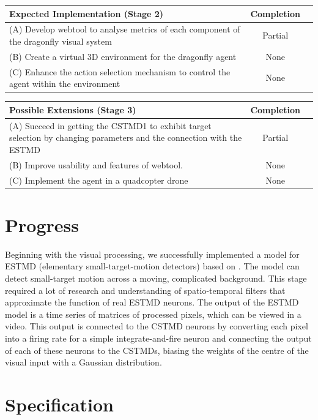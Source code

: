 \documentclass[a4paper,11pt]{article}
\begin{document}
\begin{center}
    \begin{tabular}{p{12cm} c c}
    \textbf{Expected Implementation (Stage 2)} & \textbf{Completion} \\ \hline
	(A) Develop webtool to analyse metrics of each component of the dragonfly visual system & Partial \\
	(B) Create a virtual 3D environment for the dragonfly agent & None\\
	(C) Enhance the action selection mechanism to control the agent within the environment & None\\
    \end{tabular}
\end{center}

\begin{center}
    \begin{tabular}{p{12cm} c c}
    \textbf{Possible Extensions (Stage 3)} & \textbf{Completion} \\ \hline
	(A) Succeed in getting the CSTMD1 to exhibit target selection by changing parameters and the connection with the ESTMD & Partial\\
	(B) Improve usability and features of webtool. & None\\
	(C) Implement the agent in a quadcopter drone & None\\
    \end{tabular}
\end{center}


\section{Progress}

Beginning with the visual processing, we successfully implemented a model for ESTMD (elementary small-target-motion detectors) based on \cite{hal11}. The model can detect small-target motion across a moving, complicated background. This stage required a lot of research and understanding of spatio-temporal filters that approximate the function of real ESTMD neurons. The output of the ESTMD model is a time series of matrices of processed pixels, which can be viewed in a video.
This output is connected to the CSTMD neurons by converting each pixel into a firing rate for a simple integrate-and-fire neuron and connecting the output of each of these neurons to the CSTMDs, biasing the weights of the centre of the visual input with a Gaussian distribution.


\section{Specification}	
\end{document}
